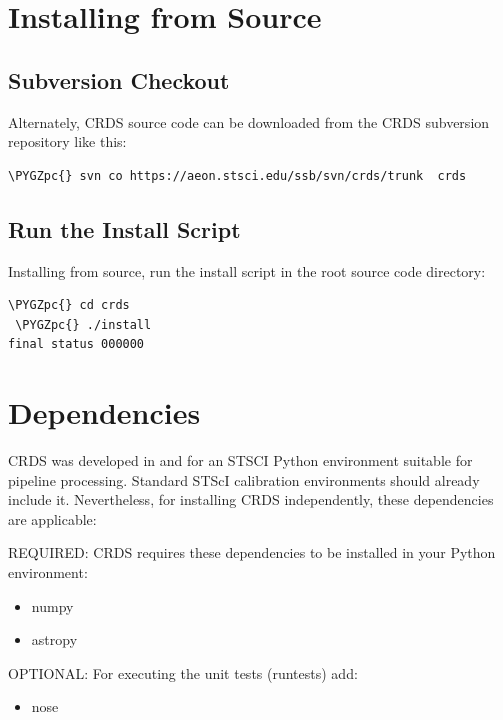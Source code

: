 \documentclass[letterpaper,10pt,english]{sphinxmanual}
\def\PYGZpc{\char`\%}
\begin{document}
\section{Installing from Source}
\label{installation:installing-from-source}

\subsection{Subversion Checkout}
\label{installation:subversion-checkout}
Alternately, CRDS source code can be downloaded from the CRDS subversion repository like this:

\begin{Verbatim}[commandchars=\\\{\}]
\PYGZpc{} svn co https://aeon.stsci.edu/ssb/svn/crds/trunk  crds
\end{Verbatim}


\subsection{Run the Install Script}
\label{installation:run-the-install-script}
Installing from source,  run the install script in the root source code directory:

\begin{Verbatim}[commandchars=\\\{\}]
 \PYGZpc{} cd crds
 \PYGZpc{} ./install
final status 000000
\end{Verbatim}


\section{Dependencies}
\label{installation:dependencies}
CRDS was developed in and for an STSCI Python environment suitable for pipeline
processing.   Standard STScI calibration environments should already include it.
Nevertheless, for installing CRDS independently, these dependencies are applicable:

REQUIRED: CRDS requires these dependencies to be installed in your Python environment:
\begin{itemize}
\item {} 
numpy

\item {} 
astropy

\end{itemize}

OPTIONAL: For executing the unit tests (runtests) add:
\begin{itemize}
\item {} 
nose

\end{itemize}
\end{document}
